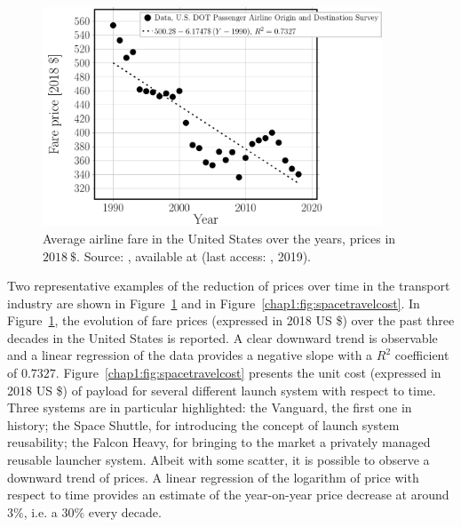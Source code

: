 \begin{description}
\begin{figure}[!h]
\includegraphics[width=0.9\textwidth]{pics/airlinefarecost.pdf}
\caption{Average airline fare in the United States over the years, prices in $2018\ \$$. Source: , available at \href{}{} (last access: , 2019).}\label{chap1:fig:airlinefarecost}
\end{figure}

Two representative examples of the reduction of prices over time in the transport industry are shown in Figure~\ref{chap1:fig:airlinefarecost} and in Figure~\ref{chap1:fig:spacetravelcost}. In Figure~\ref{chap1:fig:airlinefarecost}, the evolution of fare prices (expressed in 2018 US \$) over the past three decades in the United States is reported. A clear downward trend is observable and a linear regression of the data provides a negative slope with a $R^{2}$ coefficient of $0.7327$. Figure~\ref{chap1:fig:spacetravelcost} presents the unit cost (expressed in 2018 US \$) of payload for several different launch system with respect to time. Three systems are in particular highlighted: the Vanguard, the first one in history; the Space Shuttle, for introducing the concept of launch system reusability; the Falcon Heavy, for bringing to the market a privately managed reusable launcher system. Albeit with some scatter, it is possible to observe a downward trend of prices. A linear regression of the logarithm of price with respect to time provides an estimate of the year-on-year price decrease at around $3\%$, i.e. a $30\%$ every decade.


\end{description}

